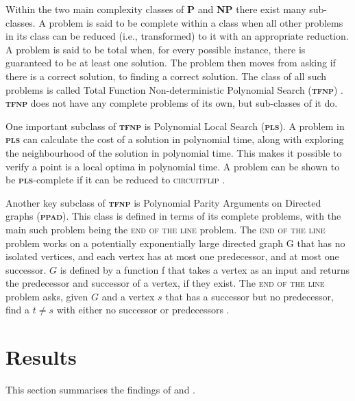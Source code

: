 \documentclass{article}
\begin{document}
Within the two main complexity classes of \textbf{\textsc{P}} and \textbf{\textsc{NP}} there exist many sub-classes. A problem is said to be complete within a class when all other problems in its class can be reduced (i.e., transformed) to it with an appropriate reduction. A problem is said to be total when, for every possible instance, there is guaranteed to be at least one solution. The problem then moves from asking if there is a correct solution, to finding a correct solution. The class of all such problems is called Total Function Non-deterministic Polynomial Search (\textbf{\textsc{tfnp}}) \cite{Wigderson.2019}. \textbf{\textsc{tfnp}} does not have any complete problems of its own, but sub-classes of it do.

One important subclass of \textbf{\textsc{tfnp}} is Polynomial Local Search (\textbf{\textsc{pls}}). A problem in \textbf{\textsc{pls}} can calculate the cost of a solution in polynomial time, along with exploring the neighbourhood of the solution in polynomial time. This makes it possible to verify a point is a local optima in polynomial time. A problem can be shown to be \textbf{\textsc{pls}}-complete if it can be reduced to \textsc{circuitflip} \cite{Borzechowski.19thSeptember2016}.

Another key subclass of \textbf{\textsc{tfnp}} is Polynomial Parity Arguments on Directed graphs (\textbf{\textsc{ppad}}). This class is defined in terms of its complete problems, with the main such problem being the \textsc{end of the line} problem. The \textsc{end of the line} problem works on a potentially exponentially large directed graph G that has no isolated vertices, and each vertex has at most one predecessor, and at most one successor. $G$ is defined by a function f that takes a vertex as an input and returns the predecessor and successor of a vertex, if they exist. The \textsc{end of the line} problem asks, given $G$ and a vertex $s$ that has a successor but no predecessor, find a $t \neq s$ with either no successor or predecessors \cite{PapadimitriouChristosH..}.



\section{Results}
This section summarises the findings of \cite{Daskalakis.2009} and \cite{Fabrikant.2004}.
\end{document}
